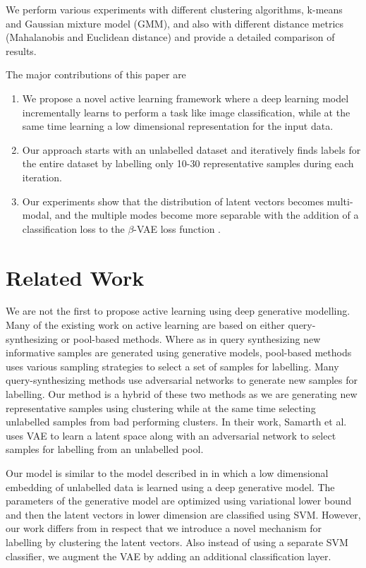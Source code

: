 \documentclass[runningheads]{llncs}
\begin{document}
We perform various experiments with different clustering algorithms,  k-means and Gaussian mixture model (GMM), and also with different distance metrics (Mahalanobis and Euclidean distance) and provide a detailed comparison of results.

The major contributions of this paper are
\begin{enumerate}
    \item We propose a novel active learning framework where a  deep learning model incrementally learns to perform a task like image classification, while at the same time learning a low dimensional representation for the input data.
    \item Our approach starts with an unlabelled dataset and iteratively finds labels for the entire dataset by labelling only 10-30 representative samples during each iteration.
    \item Our experiments show that the distribution of latent vectors becomes multi-modal, and the multiple modes become more separable with the addition of a classification loss to the $\beta$-VAE loss function \cite{beta_vae}.
\end{enumerate}

\section{Related Work}
We are not the first to propose active learning using deep generative modelling.
Many of the existing work on active learning are based on either query-synthesizing or  pool-based methods.
Where as in query synthesizing new informative samples are generated using generative models, pool-based methods \cite{wang_2016,beluch_2018} uses various sampling strategies to select a set of samples for labelling.
Many query-synthesizing methods use adversarial networks \cite{mahapatra_2018,mayer_2020} to generate new samples for labelling.
Our method is a hybrid of these two methods as we are generating new representative samples using clustering while at the same time selecting unlabelled samples from bad performing clusters.
In their work, Samarth et al. \cite{vaal} uses VAE to learn a latent space along with an adversarial network to select samples for labelling from an unlabelled pool.

Our model is similar to the model described in \cite{kingma_2014} in which a low dimensional embedding of unlabelled data is learned using a deep generative model.
The parameters of the generative model are optimized using variational lower bound and then the latent vectors in lower dimension are classified using SVM.
However, our work differs from \cite{kingma_2014} in respect that we introduce a novel mechanism for labelling by clustering the latent vectors.
Also instead of using a separate SVM classifier, we augment the VAE by adding an additional classification layer.
\end{document}
